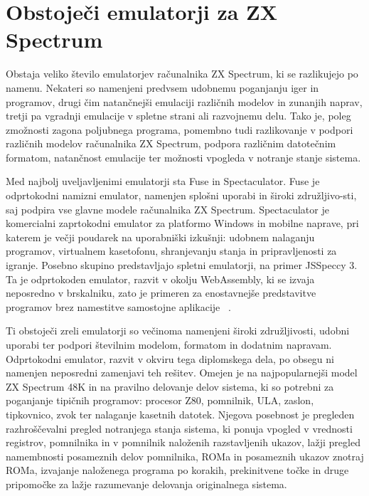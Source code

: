 \documentclass[a4paper, 12pt, openright]{book}
\begin{document}
    \section{Obstoječi emulatorji za ZX Spectrum}

    Obstaja veliko število emulatorjev računalnika ZX Spectrum, ki se
    razlikujejo po namenu. Nekateri so namenjeni predvsem udobnemu poganjanju iger
    in programov, drugi čim natančnejši emulaciji različnih modelov in zunanjih
    naprav, tretji pa vgradnji emulacije v spletne strani ali razvojnemu delu.
    Tako je, poleg zmožnosti zagona poljubnega programa, pomembno tudi
    razlikovanje v podpori različnih modelov računalnika ZX Spectrum, podpora različnim
    datotečnim formatom, natančnost emulacije ter možnosti vpogleda v notranje
    stanje sistema.

    Med najbolj uveljavljenimi emulatorji sta Fuse in Spectaculator. Fuse je odprtokodni
    namizni emulator, namenjen splošni uporabi in široki združljivo-sti, saj podpira
    vse glavne modele računalnika ZX Spectrum. Spectaculator je komercialni
    zaprtokodni emulator za platformo Windows in mobilne naprave, pri katerem je večji
    poudarek na uporabniški izkušnji: udobnem nalaganju programov, virtualnem kasetofonu,
    shranjevanju stanja in pripravljenosti za igranje. Posebno skupino predstavljajo
    spletni emulatorji, na primer JSSpeccy 3. Ta je odprtokoden emulator, razvit v
    okolju WebAssembly, ki se izvaja neposredno v brskalniku, zato je primeren za
    enostavnejše predstavitve programov brez namestitve samostojne aplikacije ~\cite{fuseemulator,
    spectaculator, jsspeccy3}.

    Ti obstoječi zreli emulatorji so večinoma namenjeni široki združljivosti, udobni
    uporabi ter podpori številnim modelom, formatom in dodatnim napravam. Odprtokodni
    emulator, razvit v okviru tega diplomskega dela, po obsegu ni namenjen neposredni
    zamenjavi teh rešitev. Omejen je na najpopularnejši model ZX Spectrum 48K in
    na pravilno delovanje delov sistema, ki so potrebni za poganjanje tipičnih programov:
    procesor Z80, pomnilnik, ULA, zaslon, tipkovnico, zvok ter nalaganje kasetnih
    datotek. Njegova posebnost je pregleden razhroščevalni pregled notranjega
    stanja sistema, ki ponuja vpogled v vrednosti registrov, pomnilnika in v
    pomnilnik naloženih razstavljenih ukazov, lažji pregled namembnosti posameznih
    delov pomnilnika, ROMa in posameznih ukazov znotraj ROMa, izvajanje naloženega
    programa po korakih, prekinitvene točke in druge pripomočke za lažje
    razumevanje delovanja originalnega sistema.
\end{document}
